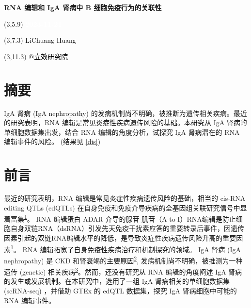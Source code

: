 \documentclass[
]{article}
\author{}
\date{\vspace{-2.5em}}
\begin{document}
\begin{titlepage} 
\begin{center} \textbf{\Huge RNA 编辑和 IgA
肾病中 B 细胞免疫行为的关联性} \vspace{4em}
\begin{textblock}{10}(3,5.9) \huge
\textbf{\textcolor{white}{2023-11-21}}
\end{textblock} \begin{textblock}{10}(3,7.3)
\Large \textcolor{black}{LiChuang Huang}
\end{textblock} \begin{textblock}{10}(3,11.3)
\Large \textcolor{black}{@立效研究院}
\end{textblock} \end{center} \end{titlepage}
\restoregeometry


\tableofcontents

\listoffigures

\listoftables

\newpage


\hypertarget{abstract}{%
\section{摘要}\label{abstract}}

IgA 肾病 (IgA nephropathy) 的发病机制尚不明确，被推断为遗传相关疾病。最近的研究表明，RNA 编辑是常见炎症性疾病遗传风险的基础。本研究从 IgA 肾病的单细胞数据集出发，结合 RNA 编辑的角度分析，试探究 IgA 肾病潜在的 RNA 编辑事件的风险。 (结果见 \ref{dis})

\hypertarget{introduction}{%
\section{前言}\label{introduction}}

最近的研究表明，RNA 编辑是常见炎症性疾病遗传风险的基础，相当的 cis-RNA editing QTLs (edQTLs) 在自身免疫和免疫介导疾病的全基因组关联研究信号中显着富集\textsuperscript{\protect\hyperlink{ref-RnaEditingUndLiQi2022}{1}}。
RNA 编辑蛋白 ADAR 介导的腺苷-肌苷（A-to-I）RNA编辑是防止细胞自身双链RNA（dsRNA）引发先天免疫干扰素应答的重要转录后事件，因遗传因素引起的双链RNA编辑水平的降低，是导致炎症性疾病遗传风险升高的重要因素\textsuperscript{\protect\hyperlink{ref-RnaEditingUndLiQi2022}{1}}。
RNA 编辑拓宽了自身免疫性疾病治疗和机制探究的领域。
IgA 肾病 (IgA nephropathy) 是 CKD 和肾衰竭的主要原因\textsuperscript{\protect\hyperlink{ref-IgaNephropathyRodrig2017}{2}}, 发病机制尚不明确，被推测为一种遗传 (genetic) 相关疾病\textsuperscript{\protect\hyperlink{ref-ImmuneAbnormalGentil2023}{3}}。然而，还没有研究从 RNA 编辑的角度阐述 IgA 肾病的发生或发展机制。在本研究中，选用了一组 IgA 肾病相关的单细胞数据集 (scRNA-seq) ，并借助 GTEx 的 edQTL 数据集，探究 IgA 肾病细胞中可能的 RNA 编辑事件。
\end{document}
